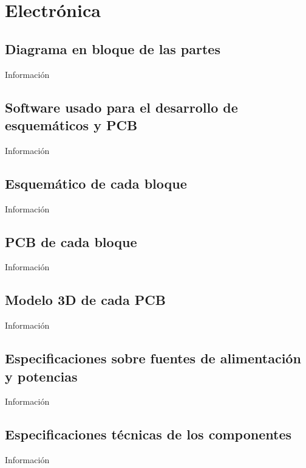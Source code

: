 \chapter{Electrónica}

\section{Diagrama en bloque de las partes}
Información

\section{Software usado para el desarrollo de esquemáticos y PCB}
Información

\section{Esquemático de cada bloque}
Información

\section{PCB de cada bloque}
Información

\section{Modelo 3D de cada PCB}
Información

\section{Especificaciones sobre fuentes de alimentación y potencias}
Información

\section{Especificaciones técnicas de los componentes}
Información